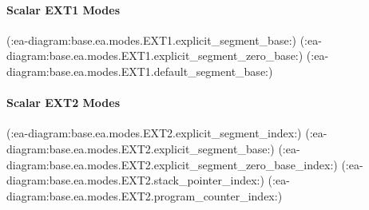 \paragraph{Scalar EXT1 Modes}\mbox{}\par
(:ea-diagram:base.ea.modes.EXT1.explicit_segment_base:)
\clearpage
(:ea-diagram:base.ea.modes.EXT1.explicit_segment_zero_base:)
\clearpage
(:ea-diagram:base.ea.modes.EXT1.default_segment_base:)

\clearpage
\paragraph{Scalar EXT2 Modes}\mbox{}\par
(:ea-diagram:base.ea.modes.EXT2.explicit_segment_index:)
\clearpage
(:ea-diagram:base.ea.modes.EXT2.explicit_segment_base:)
\clearpage
(:ea-diagram:base.ea.modes.EXT2.explicit_segment_zero_base_index:)
\clearpage
(:ea-diagram:base.ea.modes.EXT2.stack_pointer_index:)
\clearpage
(:ea-diagram:base.ea.modes.EXT2.program_counter_index:)
